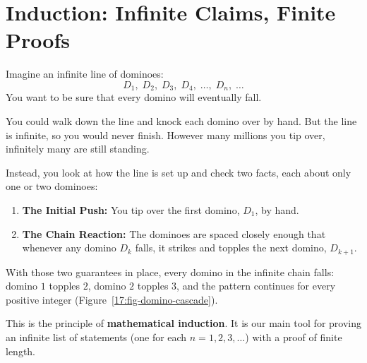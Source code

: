 \section{Induction: Infinite Claims, Finite Proofs}
\chapterline

Imagine an infinite line of dominoes:
\[
D_1, \; D_2, \; D_3, \; D_4, \; \dots, \; D_n, \; \dots
\]
You want to be sure that every domino will eventually fall.

You could walk down the line and knock each domino over by hand. But the line is infinite, so you would never finish. However many millions you tip over, infinitely many are still standing.

Instead, you look at how the line is set up and check two facts, each about only one or two dominoes:
\begin{enumerate}[label=\arabic*.]
\item \textbf{The Initial Push:} You tip over the first domino, $D_1$, by hand.
\item \textbf{The Chain Reaction:} The dominoes are spaced closely enough that whenever any domino $D_k$ falls, it strikes and topples the next domino, $D_{k+1}$.
\end{enumerate}

With those two guarantees in place, every domino in the infinite chain falls: domino $1$ topples $2$, domino $2$ topples $3$, and the pattern continues for every positive integer (Figure~\ref{17:fig-domino-cascade}).

This is the principle of \textbf{mathematical induction}. It is our main tool for proving an infinite list of statements (one for each $n = 1, 2, 3, \dots$) with a proof of finite length.

